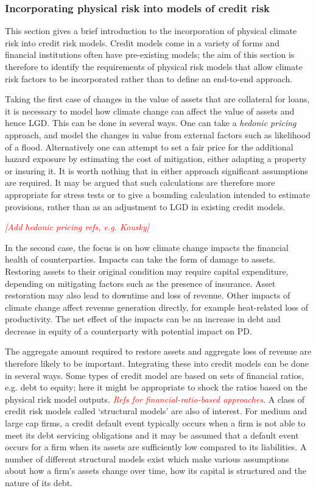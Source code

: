\documentclass[a4paper,11pt]{extarticle} %
\theoremstyle{definition}
\begin{document}
\subsubsection{Incorporating physical risk into models of credit risk}
This section gives a brief introduction to the incorporation of physical climate risk into credit risk models. Credit models come in a variety of forms and financial institutions often have pre-existing models; the aim of this section is therefore to identify the requirements of physical risk models that allow climate risk factors to be incorporated rather than to define an end-to-end approach.

Taking the first case of changes in the value of assets that are collateral for loans, it is necessary to model how climate change can affect the value of assets and hence LGD. This can be done in several ways. One can take a \emph{hedonic pricing} approach, and model the changes in value from external factors such as likelihood of a flood. Alternatively one can attempt to set a fair price for the additional hazard exposure by estimating the cost of mitigation, either adapting a property or insuring it. It is worth nothing that in either approach significant assumptions are required. It may be argued that such calculations are therefore more appropriate for stress tests or to give a bounding calculation intended to estimate provisions, rather than as an adjustment to LGD in existing credit models.

{\textcolor{red}{\emph{[Add hedonic pricing refs, e.g. Kousky]}}}

In the second case, the focus is on how climate change impacts the financial health of counterparties. Impacts can take the form of damage to assets. Restoring assets to their original condition may require capital expenditure, depending on mitigating factors such as the presence of insurance. Asset restoration may also lead to downtime and loss of revenue. Other impacts of climate change affect revenue generation directly, for example heat-related loss of productivity. The net effect of the impacts can be an increase in debt and decrease in equity of a counterparty with potential impact on PD.

The aggregate amount required to restore assets and aggregate loss of revenue are therefore likely to be important. Integrating these into credit models can be done in several ways. Some types of credit model are based on sets of financial ratios, e.g. debt to equity; here it might be appropriate to shock the ratios based on the physical risk model outputs. {\textcolor{red}{\emph{Refs for financial-ratio-based approaches}}}. A class of credit risk models called `structural models' are also of interest. For medium and large cap firms, a credit default event typically occurs when a firm is not able to meet its debt servicing obligations and it may be assumed that a default event occurs for a firm when its assets are sufficiently low compared to its liabilities. A number of different structural models exist which make various assumptions about how a firm's assets change over time, how its capital is structured and the nature of its debt.
\end{document}
